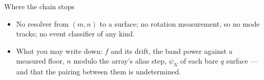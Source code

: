 \documentclass[aspectratio=169]{beamer}
\begin{document}
\begin{frame}{Where the chain stops}
  \begin{itemize}
    \item No resolver from $(m, n)$ to a surface; no rotation measurement, so no
      mode tracks; no event classifier of any kind.
    \item What you may write down: $f$ and its drift, the band power against a
      measured floor, $n$ modulo the array's alias step, $\psi_{N}$ of each bare
      $q$ surface --- and that the pairing between them is undetermined.
  \end{itemize}
\end{frame}
\end{document}
